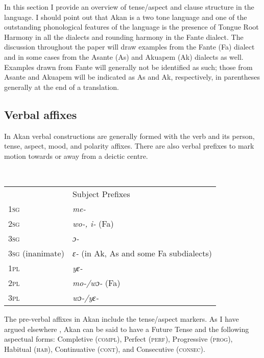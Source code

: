 \documentclass[output=paper]{langsci/langscibook}
\begin{document}
In this section I provide an overview of tense/aspect and clause structure in the language. I should point out that Akan is a two tone language and one of the outstanding phonological features of the language is the presence of Tongue Root Harmony in all the dialects and rounding harmony in the Fante dialect. The discussion throughout the paper will draw examples from the Fante (Fa) dialect and in some cases from the Asante (As) and Akuapem (Ak) dialects as well. Examples drawn from Fante will generally not be identified as such; those from Asante and Akuapem will be indicated as As and Ak, respectively, in parentheses generally at the end of a translation.

\subsection{Verbal affixes}\label{§2.1:verbal.osam}

In Akan verbal constructions are generally formed with the verb and its person, tense, aspect, mood, and polarity affixes. There are also verbal prefixes to mark motion towards or away from a deictic centre.

\ea
\label{ex:1.osam}
 \\
\begin{table}
\begin{tabular}{ll}
 & Subject Prefixes \\
     \textsc{1sg} & \textit{me-}\\
     \textsc{2sg} & \textit{wo-, i-} (Fa)\\
     \textsc{3sg} & \textit{ɔ-}\\
     \textsc{3sg} (inanimate) & \textit{ɛ- } (in Ak, As and some Fa subdialects)\\
     \textsc{1pl} & \textit{yɛ-}\\
     \textsc{2pl} & \textit{mo-/wɔ-} (Fa)\\
     \textsc{3pl} & \textit{wɔ-/yɛ-}\\
\end{tabular}
\end{table}
\z

The pre-verbal affixes in Akan include the tense/aspect markers. As I have argued elsewhere \citep{osam1994a,osam2008b}, Akan can be said to have a Future Tense and the following aspectual forms: Completive (\textsc{compl}), Perfect (\textsc{perf}), Progressive (\textsc{prog}), Habitual (\textsc{hab}), Continuative (\textsc{cont}), and Consecutive (\textsc{consec}).
\end{document}
